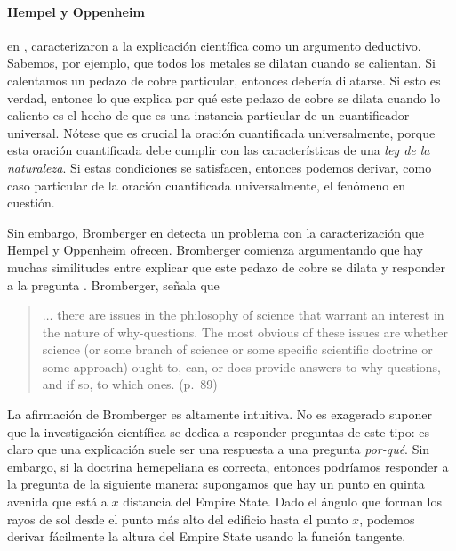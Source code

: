 \paragraph{Hempel y Oppenheim} en ,
caracterizaron a la explicación científica como un argumento
deductivo. Sabemos, por ejemplo, que todos los metales se dilatan
cuando se calientan. Si calentamos un pedazo de cobre particular,
entonces debería dilatarse. Si esto es verdad, entonce lo que
explica por qué este pedazo de cobre se dilata cuando lo caliento es
el hecho de que es una instancia particular de un cuantificador
universal. Nótese que es crucial la oración cuantificada
universalmente, porque esta oración cuantificada debe cumplir con las
características de una \emph{ley de la naturaleza}. Si estas condiciones se satisfacen, entonces podemos derivar, como caso particular
de la oración cuantificada universalmente, el fenómeno en cuestión.

Sin embargo, Bromberger en  detecta un
problema con la caracterización que Hempel y Oppenheim ofrecen.
Bromberger comienza argumentando que hay muchas similitudes entre
explicar que este pedazo de cobre se dilata y responder a la
pregunta .
Bromberger, señala que

\begin{quote}
	$\ldots$ there are issues in the philosophy of science that
	warrant an interest in the nature of why-questions. The most
	obvious of these issues are whether science (or some branch of
	science or some specific scientific doctrine or some approach)
	ought to, can, or does provide answers to why-questions, and if
	so, to which ones. (p.~89)
\end{quote}


La afirmación de Bromberger es altamente intuitiva. No
es exagerado suponer que la investigación científica se dedica a
responder preguntas de este tipo: es claro que una explicación suele ser una respuesta a una
pregunta \emph{por-qué}. Sin embargo, si la doctrina hemepeliana es
correcta, entonces podríamos responder a la pregunta  de la siguiente manera: supongamos
que hay un punto en quinta avenida que está a $x$ distancia del Empire State.
Dado el ángulo que forman los rayos de sol desde el punto más alto del edificio
hasta el punto $x$, podemos derivar fácilmente la altura del Empire State usando
la función tangente.

